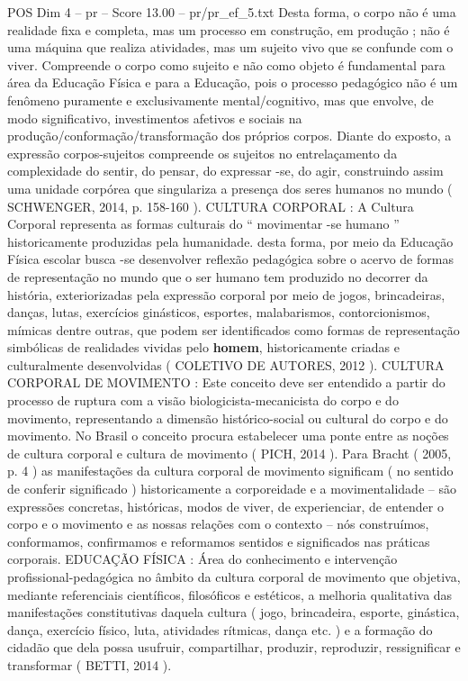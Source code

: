 \begin{textsample}{POS Dim 4 – pr – Score 13.00 – pr/pr\_ef\_5.txt}
Desta forma, o corpo não é uma realidade fixa e completa, mas um processo em construção, em produção ; não é uma máquina que realiza atividades, mas um sujeito vivo que se confunde com o viver.
Compreende o corpo como sujeito e não como objeto é fundamental para área da Educação Física e para a Educação, pois o processo pedagógico não é um fenômeno puramente e exclusivamente mental/cognitivo, mas que envolve, de modo significativo, investimentos afetivos e sociais na produção/conformação/transformação dos próprios corpos.
Diante do exposto, a expressão corpos-sujeitos compreende os sujeitos no entrelaçamento da complexidade do sentir, do pensar, do expressar -se, do agir, construindo assim uma unidade corpórea que singulariza a presença dos seres humanos no mundo ( SCHWENGER, 2014, p. 158-160 ).
CULTURA CORPORAL : A Cultura Corporal representa as formas culturais do “ movimentar -se humano ” historicamente produzidas pela humanidade. desta forma, por meio da Educação Física escolar busca -se desenvolver reflexão pedagógica sobre o acervo de formas de representação no mundo que o ser humano tem produzido no decorrer da história, exteriorizadas pela expressão corporal por meio de jogos, brincadeiras, danças, lutas, exercícios ginásticos, esportes, malabarismos, contorcionismos, mímicas dentre outras, que podem ser identificados como formas de representação simbólicas de realidades vividas pelo \textbf{homem}, historicamente criadas e culturalmente desenvolvidas ( COLETIVO DE AUTORES, 2012 ).
CULTURA CORPORAL DE MOVIMENTO : Este conceito deve ser entendido a partir do processo de ruptura com a visão biologicista-mecanicista do corpo e do movimento, representando a dimensão histórico-social ou cultural do corpo e do movimento.
No Brasil o conceito procura estabelecer uma ponte entre as noções de cultura corporal e cultura de movimento ( PICH, 2014 ).
Para Bracht ( 2005, p. 4 ) as manifestações da cultura corporal de movimento significam ( no sentido de conferir significado ) historicamente a corporeidade e a movimentalidade – são expressões concretas, históricas, modos de viver, de experienciar, de entender o corpo e o movimento e as nossas relações com o contexto – nós construímos, conformamos, confirmamos e reformamos sentidos e significados nas práticas corporais.
EDUCAÇÃO FÍSICA : Área do conhecimento e intervenção profissional-pedagógica no âmbito da cultura corporal de movimento que objetiva, mediante referenciais científicos, filosóficos e estéticos, a melhoria qualitativa das manifestações constitutivas daquela cultura ( jogo, brincadeira, esporte, ginástica, dança, exercício físico, luta, atividades rítmicas, dança etc. ) e a formação do cidadão que dela possa usufruir, compartilhar, produzir, reproduzir, ressignificar e transformar ( BETTI, 2014 ).

\end{textsample}
